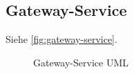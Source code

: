 \subsection{Gateway-Service}
Siehe \autoref{fig:gateway-service}.
\begin{figure}[h]
    \centering
    \caption{Gateway-Service UML}
    \label{fig:gateway-service}
\end{figure}

